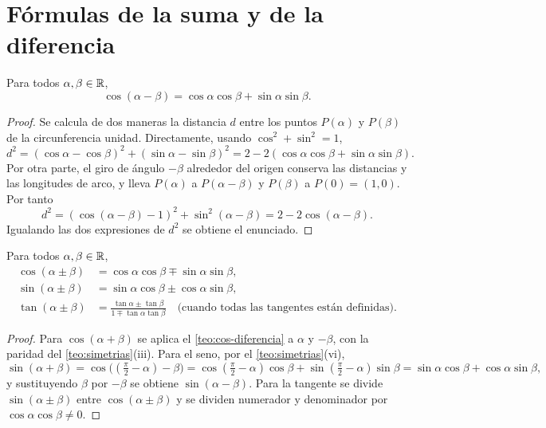 \section{Fórmulas de la suma y de la diferencia}

\begin{teorema}\label{teo:cos-diferencia}
Para todos $\alpha,\beta\in\mathbb{R}$,
\[
\cos(\alpha-\beta)=\cos\alpha\cos\beta+\sin\alpha\sin\beta .
\]
\end{teorema}

\begin{proof}
Se calcula de dos maneras la distancia $d$ entre los puntos $P(\alpha)$ y $P(\beta)$ de la circunferencia unidad. Directamente, usando $\cos^{2}+\sin^{2}=1$,
\[
d^{2}=(\cos\alpha-\cos\beta)^{2}+(\sin\alpha-\sin\beta)^{2}=2-2(\cos\alpha\cos\beta+\sin\alpha\sin\beta).
\]
Por otra parte, el giro de ángulo $-\beta$ alrededor del origen conserva las distancias y las longitudes de arco, y lleva $P(\alpha)$ a $P(\alpha-\beta)$ y $P(\beta)$ a $P(0)=(1,0)$. Por tanto
\[
d^{2}=(\cos(\alpha-\beta)-1)^{2}+\sin^{2}(\alpha-\beta)=2-2\cos(\alpha-\beta).
\]
Igualando las dos expresiones de $d^{2}$ se obtiene el enunciado.
\end{proof}

\begin{corolario}\label{cor:suma}
Para todos $\alpha,\beta\in\mathbb{R}$,
\begin{align*}
\cos(\alpha\pm\beta)&=\cos\alpha\cos\beta\mp\sin\alpha\sin\beta,\\
\sin(\alpha\pm\beta)&=\sin\alpha\cos\beta\pm\cos\alpha\sin\beta,\\
\tan(\alpha\pm\beta)&=\frac{\tan\alpha\pm\tan\beta}{1\mp\tan\alpha\tan\beta}\quad\text{(cuando todas las tangentes están definidas).}
\end{align*}
\end{corolario}

\begin{proof}
Para $\cos(\alpha+\beta)$ se aplica el \cref{teo:cos-diferencia} a $\alpha$ y $-\beta$, con la paridad del \cref{teo:simetrias}(iii). Para el seno, por el \cref{teo:simetrias}(vi),
\[
\sin(\alpha+\beta)=\cos\bigl((\tfrac{\pi}{2}-\alpha)-\beta\bigr)=\cos(\tfrac{\pi}{2}-\alpha)\cos\beta+\sin(\tfrac{\pi}{2}-\alpha)\sin\beta=\sin\alpha\cos\beta+\cos\alpha\sin\beta,
\]
y sustituyendo $\beta$ por $-\beta$ se obtiene $\sin(\alpha-\beta)$. Para la tangente se divide $\sin(\alpha\pm\beta)$ entre $\cos(\alpha\pm\beta)$ y se dividen numerador y denominador por $\cos\alpha\cos\beta\ne0$.
\end{proof}

